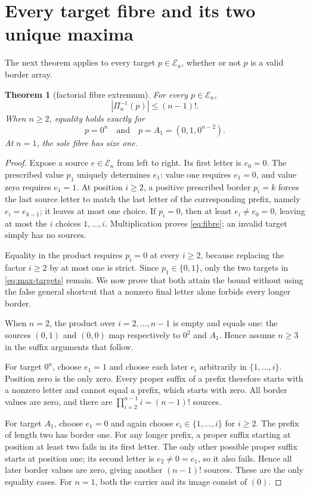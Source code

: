 \documentclass[10pt,a4paper]{amsart}
\newtheorem{theorem}{Theorem}[section]
\theoremstyle{definition}
\theoremstyle{remark}
\newcommand{\En}{\mathcal E_n}
\begin{document}
\section{Every target fibre and its two unique maxima}

The next theorem applies to every target $p\in\En$, whether or not $p$ is a
valid border array.

\begin{theorem}[factorial fibre extremum]\label{thm:fibre}
For every $p\in\En$,
\begin{equation}
                         |\Pi_n^{-1}(p)|\le(n-1)!.     \label{eq:fibre}
\end{equation}
When $n\ge2$, equality holds exactly for
\begin{equation}
                     p=0^n\quad\text{and}\quad
                     p=A_1=(0,1,0^{n-2}).             \label{eq:max-targets}
\end{equation}
At $n=1$, the sole fibre has size one.
\end{theorem}

\begin{proof}
Expose a source $e\in\En$ from left to right.  Its first letter is
$e_0=0$.  The prescribed value $p_1$ uniquely determines $e_1$: value one
requires $e_1=0$, and value zero requires $e_1=1$.  At position $i\ge2$, a
positive prescribed border $p_i=k$ forces the last source letter to match
the last letter of the corresponding prefix, namely $e_i=e_{k-1}$; it leaves
at most one choice.  If $p_i=0$, then at least $e_i\ne e_0=0$, leaving at
most the $i$ choices $1,\ldots,i$.  Multiplication proves \eqref{eq:fibre};
an invalid target simply has no sources.

Equality in the product requires $p_i=0$ at every $i\ge2$, because replacing
the factor $i\ge2$ by at most one is strict.  Since $p_1\in\{0,1\}$, only the
two targets in \eqref{eq:max-targets} remain.  We now prove that both attain
the bound without using the false general shortcut that a nonzero final
letter alone forbids every longer border.

When $n=2$, the product over $i=2,\ldots,n-1$ is empty and equals one: the
sources $(0,1)$ and $(0,0)$ map respectively to $0^2$ and $A_1$.  Hence
assume $n\ge3$ in the suffix arguments that follow.

For target $0^n$, choose $e_1=1$ and choose each later $e_i$ arbitrarily in
$\{1,\ldots,i\}$.  Position zero is the only zero.  Every proper suffix of a
prefix therefore starts with a nonzero letter and cannot equal a prefix,
which starts with zero.  All border values are zero, and there are
$\prod_{i=2}^{n-1}i=(n-1)!$ sources.

For target $A_1$, choose $e_1=0$ and again choose
$e_i\in\{1,\ldots,i\}$ for $i\ge2$.  The prefix of length two has border one.
For any longer prefix, a proper suffix starting at position at least two
fails in its first letter.  The only other possible proper suffix starts at
position one; its second letter is $e_2\ne0=e_1$, so it also fails.  Hence all
later border values are zero, giving another $(n-1)!$ sources.  These are the
only equality cases.  For $n=1$, both the carrier and its image consist of
$(0)$.
\end{proof}
\end{document}

